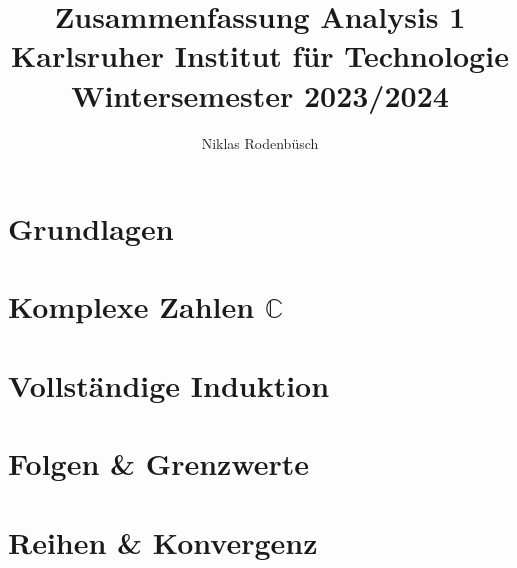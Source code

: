 \documentclass[ngerman,12pt,a4paper
,pdftex]{article}
\title{Zusammenfassung Analysis 1 \\[1ex] \large Karlsruher Institut für Technologie \\[1ex] Wintersemester 2023/2024}
\author{Niklas Rodenbüsch}
\date{}
\newcommand{\f}[1]{$#1$}
\theoremstyle{nodot}
\newtheorem*{definition}{Definition:}
\theoremstyle{nodot}
\begin{document}
    \pagestyle{fancy}
    \fancyhf{}
    \fancyhead[L]{\nouppercase{\leftmark}}
    \fancyfoot[C]{\thepage}
    \renewcommand{\headrulewidth}{0.2pt}

    \maketitle
    \newpage
    

    \begin{onehalfspace}
        \tableofcontents
        \newpage
        \setcounter{savepage}{\value{page}}
        \newpage

        \section{Grundlagen}
        
        \section{Komplexe Zahlen \f{\mathbb{C}}}
        
        \section{Vollständige Induktion}
        
        \section{Folgen \& Grenzwerte}
        
        \section{Reihen \& Konvergenz}
        

\end{onehalfspace}
\end{document}
